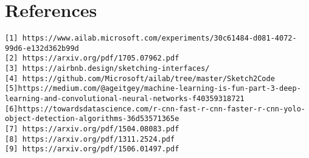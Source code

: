 
\chapter{References}
\begin{verbatim}
[1] https://www.ailab.microsoft.com/experiments/30c61484-d081-4072-99d6-e132d362b99d
[2] https://arxiv.org/pdf/1705.07962.pdf
[3] https://airbnb.design/sketching-interfaces/
[4] https://github.com/Microsoft/ailab/tree/master/Sketch2Code
[5]https://medium.com/@ageitgey/machine-learning-is-fun-part-3-deep-learning-and-convolutional-neural-networks-f40359318721
[6]https://towardsdatascience.com/r-cnn-fast-r-cnn-faster-r-cnn-yolo-object-detection-algorithms-36d53571365e
[7] https://arxiv.org/pdf/1504.08083.pdf
[8] https://arxiv.org/pdf/1311.2524.pdf
[9] https://arxiv.org/pdf/1506.01497.pdf
\end{verbatim}






